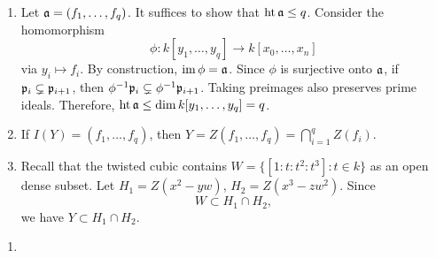 \documentclass[10pt]{amsart}
\begin{document}
\begin{solution}
\begin{enumerate}
    \item Let $\mathfrak{a} = (f_1, \dots, f_q)$. It suffices to show that $\operatorname{\rm{ht}} \mathfrak{a} \leq q$. Consider the homomorphism
    \[\phi: k[y_1,\dots,y_q] \to k[x_0, \dots, x_n]\] via $y_i \mapsto f_i$. By construction, $\operatorname{im} \phi = \mathfrak{a}$. Since $\phi$ is surjective onto $\mathfrak{a}$, if $\mathfrak{p}_i \subsetneq \mathfrak{p}_{i+1}$, then $\phi^{-1}\mathfrak{p}_i \subsetneq \phi^{-1}\mathfrak{p}_{i+1}$. Taking preimages also preserves prime ideals. Therefore, $\operatorname{\rm{ht}} \mathfrak{a} \leq \dim k[y_1,\dots,y_q] = q$.
    \item If $I(Y) = (f_1, \dots, f_q)$, then $Y = Z(f_1, \dots, f_q) = \bigcap_{i = 1}^{q}Z(f_i)$. 
    \item Recall that the twisted cubic contains $W = \{[1:t:t^2:t^3]:t \in k\}$ as an open dense subset. Let $H_1 = Z(x^2-yw)$, $H_2 = Z(x^3-zw^2)$. Since 
    \[W \subset H_1 \cap H_2,\]
    we have $Y \subset H_1 \cap H_2$. 
\end{enumerate}
\end{solution}

\begin{exercise}[3.15]
\end{exercise}

\begin{solution}
    \begin{enumerate}
        \item {}
    \end{enumerate}
\end{solution}
\end{document}
